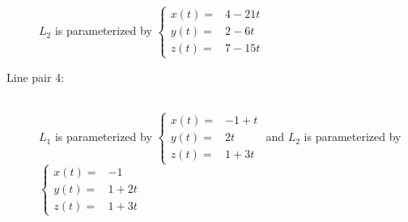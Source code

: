 \documentclass{article}
\begin{document}
\begin{description}
\(L_2\) is parameterized by \(\left\{\begin{array}{rl} x(t) = & 4 - 21t \\ y(t) = & 2 - 6t \\ z(t) = & 7 - 15t \end{array}\right.\)
\item[Line pair 4:] ~ \\
\(L_1\) is parameterized by \(\left\{\begin{array}{rl} x(t) = & -1 + t \\ y(t) = & 2t \\ z(t) = & 1 + 3t \end{array}\right.\) and
\(L_2\) is parameterized by \(\left\{\begin{array}{rl} x(t) = & -1 \\ y(t) = & 1 + 2t \\ z(t) = & 1 + 3t \end{array}\right.\)
\end{description}
\end{document}
